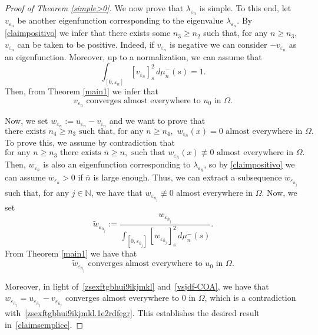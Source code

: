 \documentclass[12pt,a4paper,intlimits,sumlimits]{amsart}
\def \N {\mathbb{N}}
\theoremstyle{definition}
\theoremstyle{plain}
\numberwithin{equation}{section}
\renewcommand{\geq}{\geqslant}
\begin{document}
\begin{proof}[Proof of Theorem \ref{simple>0}]
We now prove that $\lambda_{\varepsilon_n}$ is simple.
To this end, let $v_{\varepsilon_n}$ be another eigenfunction corresponding to the eigenvalue $\lambda_{\varepsilon_n}$. By \eqref{claimpositivo} we infer that there exists some $n_3\geq n_2$ such that, for any $n\geq n_3$, $v_{\varepsilon_n}$ can be taken to be positive. Indeed, if $v_{\varepsilon_n}$ is negative we can consider $-v_{\varepsilon_n}$
as an eigenfunction. Moreover, up to a normalization, we can assume that 
\[
\int_{[0, \varepsilon_n]}[v_{\varepsilon_n}]^2_s\,d\mu^-_n(s)=1.
\]
Then, from Theorem \ref{main1} we infer that \begin{equation}\label{vsjdf-COA}
{\mbox{$v_{\varepsilon_n}$ converges almost everywhere to $u_0$ in $\Omega$.}}\end{equation}

Now, we set $w_{\varepsilon_n}:=u_{\varepsilon_n}-v_{\varepsilon_n}$
and we want to prove that
\begin{equation}\label{claimsemplice}
\mbox{there exists } n_4\geq n_3 \mbox{ such that, for any } n\geq n_4,\,\,
w_{\varepsilon_n}(x) =0 \mbox{ almost everywhere in } \Omega.
\end{equation}
To prove this, we assume by contradiction that 
\[
\mbox{for any } n\geq n_3 \mbox{ there exists } \overline n\geq n,
\mbox{ such that }
w_{\varepsilon_{\overline n}}(x) \not \equiv 0 \mbox{ almost everywhere in } \Omega.
\]
Then, $w_{\varepsilon_{\overline n}}$ is also an eigenfunction corresponding to $\lambda_{\varepsilon_{\overline n}}$, so by \eqref{claimpositivo} we can assume $w_{\varepsilon_{\overline n}}>0$ if $\overline{n}$ is large enough. Thus, we can extract a subsequence
$w_{\varepsilon_{\overline n_{j}}}$ such that, for any $j\in \N$, we have that $w_{\varepsilon_{\overline n_{j}}}\not \equiv 0$ almost everywhere in $\Omega$. Now, we set 
\[
\widetilde{w}_{\varepsilon_{\overline n_{j}}}:=\dfrac{w_{\varepsilon_{\overline n_{j}}}}{\displaystyle\int_{[0, \varepsilon_{\overline n_{j}}]}[w_{\varepsilon_{\overline n_{j}}}]^2_s\,d\mu^-_n(s)}.
\]
From Theorem \ref{main1} we have that 
\begin{equation}\label{zsexftgbhui9ikjmkl.1e2rdfegr}
{\mbox{$\widetilde{w}_{\varepsilon_{\overline n_{j}}}$ converges almost everywhere to $u_0$ in $\Omega$.}}\end{equation} 

Moreover, in light of~\eqref{zsexftgbhui9ikjmkl}
and~\eqref{vsjdf-COA}, we have that $w_{\varepsilon_{\overline n_{j}}}=u_{\varepsilon_{\overline n_{j}}}-v_{\varepsilon_{\overline n_{j}}}$
converges almost everywhere to $0$ in $\Omega$, which is a contradiction
with~\eqref{zsexftgbhui9ikjmkl.1e2rdfegr}. This establishes the desired result in~\eqref{claimsemplice}.
\end{proof}
\end{document}
